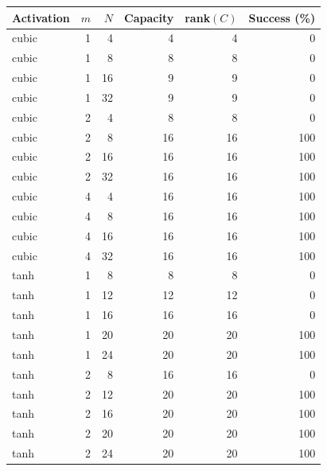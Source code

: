 \begin{tabular}{l r r r r r}
\toprule
Activation & $m$ & $N$ & Capacity & rank$(C)$ & Success (\%)\\
\midrule
cubic & 1 & 4 & 4 & 4 & 0 \\
cubic & 1 & 8 & 8 & 8 & 0 \\
cubic & 1 & 16 & 9 & 9 & 0 \\
cubic & 1 & 32 & 9 & 9 & 0 \\
cubic & 2 & 4 & 8 & 8 & 0 \\
cubic & 2 & 8 & 16 & 16 & 100 \\
cubic & 2 & 16 & 16 & 16 & 100 \\
cubic & 2 & 32 & 16 & 16 & 100 \\
cubic & 4 & 4 & 16 & 16 & 100 \\
cubic & 4 & 8 & 16 & 16 & 100 \\
cubic & 4 & 16 & 16 & 16 & 100 \\
cubic & 4 & 32 & 16 & 16 & 100 \\
tanh & 1 & 8 & 8 & 8 & 0 \\
tanh & 1 & 12 & 12 & 12 & 0 \\
tanh & 1 & 16 & 16 & 16 & 0 \\
tanh & 1 & 20 & 20 & 20 & 100 \\
tanh & 1 & 24 & 20 & 20 & 100 \\
tanh & 2 & 8 & 16 & 16 & 0 \\
tanh & 2 & 12 & 20 & 20 & 100 \\
tanh & 2 & 16 & 20 & 20 & 100 \\
tanh & 2 & 20 & 20 & 20 & 100 \\
tanh & 2 & 24 & 20 & 20 & 100 \\
\bottomrule
\end{tabular}
